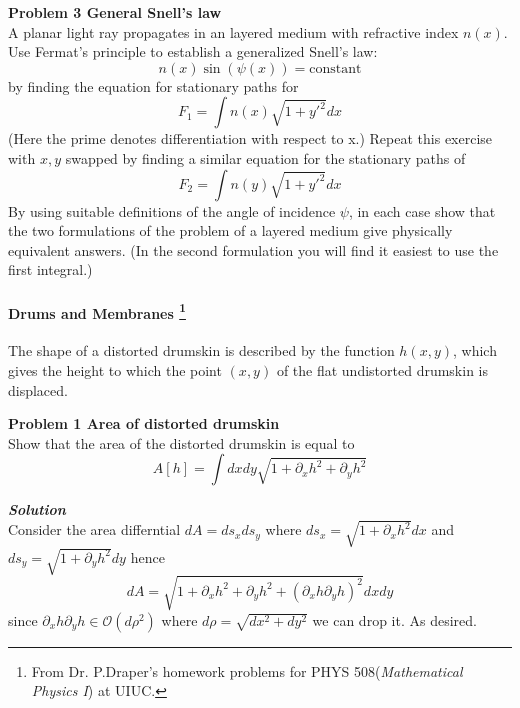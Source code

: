 \begin{framed}
\textbf{\textbf{Problem 3} General Snell's law}\\
A planar light ray propagates in an layered medium with refractive index $n(x)$. Use Fermat's principle to establish a generalized Snell's law:
\begin{equation}
n(x)\sin(\psi(x))=\text{constant}
\end{equation}
by finding the equation for stationary paths for
\begin{equation}
F_1=\int n(x)\sqrt{1+y'^2}dx
\end{equation}
(Here the prime denotes differentiation with respect to x.) Repeat this exercise with $x,y$ swapped by finding a similar equation for the stationary paths of
\begin{equation}
F_2=\int n(y)\sqrt{1+y'^2}dx
\end{equation}
By using suitable definitions of the angle of incidence $\psi$, in each case show that the two formulations of the problem of a layered medium give physically equivalent answers.
(In the second formulation you will find it easiest to use the first integral.)
\end{framed}

\paragraph{Drums and Membranes \footnote{From Dr. P.Draper's homework problems for PHYS 508(\textit{Mathematical Physics I}) at UIUC.}}

The shape of a distorted drumskin is described by the
function $h(x, y)$, which gives the height to which the point $(x, y)$ of the flat undistorted drumskin is displaced.

\begin{framed}
\textbf{\textbf{Problem 1} Area of distorted drumskin}\\
Show that the area of the distorted drumskin is equal to
\begin{equation}
A[h] = \int dxdy \sqrt{1 + \partial_x h^2 + \partial_y h^2}
\end{equation}
\end{framed}

\begin{framed}
\textbf{\textit{Solution}}\\
Consider the area differntial $dA=ds_x ds_y$ where $ds_x=\sqrt{1+\partial_x h^2}dx$ and $ds_y=\sqrt{1+\partial_y h^2}dy$ hence
\begin{equation}
dA=\sqrt{1+\partial_x h^2 + \partial_y h^2 + (\partial_x h\partial_y h)^2}dxdy
\end{equation}
since $\partial_x h\partial_y h\in \mathcal{O}(d\rho^2)$ where $d\rho = \sqrt{dx^2 + dy^2}$ we can drop it. As desired.
\end{framed}

